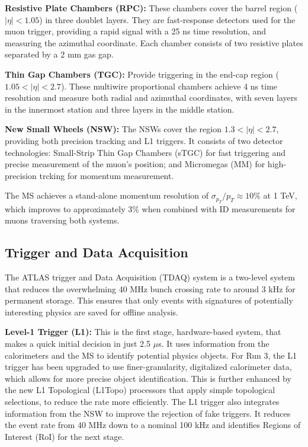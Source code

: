 \textbf{Resistive Plate Chambers (RPC):} These chambers cover the barrel region ($|\eta| < 1.05$) in three doublet layers. They are fast-response detectors used for the muon trigger, providing a rapid signal with a 25 ns time resolution, and measuring the azimuthal coordinate. Each chamber consists of two resistive plates separated by a 2 mm gas gap. 

\textbf{Thin Gap Chambers (TGC):} Provide triggering in the end-cap region ($1.05 < |\eta| < 2.7$). These multiwire proportional chambers achieve 4 ns time resolution and measure both radial and azimuthal coordinates, with seven layers in the innermost station and three layers in the middle station.

\textbf{New Small Wheels (NSW):} The NSWs cover the region $1.3 < |\eta| < 2.7$, providing both precision tracking and L1 triggers. It consists of two detector technologies: Small-Strip Thin Gap Chambers (sTGC) for fast triggering and precise measurement of the muon's position; and Micromegas (MM) for high-precision trcking for momentum measurement.

The MS achieves a stand-alone momentum resolution of $\sigma_{p_T}/p_T \approx 10\%$ at 1 TeV, which improves to approximately 3\% when combined with ID measurements for muons traversing both systems.


\subsection{Trigger and Data Acquisition}

The ATLAS trigger and Data Acquisition (TDAQ) system is a two-level system that reduces the overwhelming 40 MHz bunch crossing rate to around 3 kHz for permanent storage. This ensures that only events with signatures of potentially interesting physics are saved for offline analysis.

\textbf{Level-1 Trigger (L1):} This is the first stage, hardware-based system, that makes a quick initial decision in just 2.5 $\mu$s. It uses information from the calorimeters and the MS to identify potential physics objects. For Run 3, the L1 trigger has been upgraded to use finer-granularity, digitalized calorimeter data, which allows for more precise object identification. This is further enhanced by the new L1 Topological (L1Topo) processors that apply simple topological selections, to reduce the rate more efficiently. The L1 trigger also integrates information from the NSW to improve the rejection of fake triggers. It reduces the event rate from 40 MHz down to a nominal 100 kHz and identifies Regions of Interest (RoI) for the next stage.

